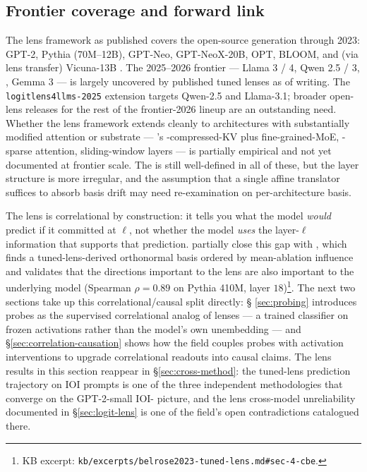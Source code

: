 \subsection{Frontier coverage and forward link}
\label{sec:lens-forward}

The lens framework as published covers the open-source generation
through 2023: GPT-2, Pythia (70M–12B), GPT-Neo, GPT-NeoX-20B, OPT,
BLOOM, and (via lens transfer) Vicuna-13B
\citep[\S 3, \S 5]{belrose2023-tuned-lens}. The 2025–2026 frontier ---
Llama 3 / 4, Qwen 2.5 / 3, , Gemma 3 --- is largely
uncovered by published tuned lenses as of writing. The
\texttt{logitlens4llms-2025} extension targets Qwen-2.5 and Llama-3.1;
broader open-lens releases for the rest of the frontier-2026 lineup
are an outstanding need. Whether the lens framework extends cleanly
to architectures with substantially modified attention or  substrate
--- 's -compressed-KV plus fine-grained-MoE, -sparse
attention, sliding-window layers --- is partially empirical and not
yet documented at frontier scale. The  is still
well-defined in all of these, but the layer structure is more
irregular, and the assumption that a single affine translator suffices
to absorb basis drift may need re-examination on per-architecture
basis.

The lens is correlational by construction: it tells you what the model
\emph{would} predict if it committed at $\ell$, not whether the model
\emph{uses} the layer-$\ell$ information that supports that prediction.
\citet[\S 4]{belrose2023-tuned-lens} partially close this gap with
\emph{}, which finds a tuned-lens-derived
orthonormal basis ordered by mean-ablation influence and validates that
the directions important to the lens are also important to the
underlying model (Spearman $\rho = 0.89$ on Pythia 410M, layer
$18$)\footnote{KB excerpt:
\nolinkurl{kb/excerpts/belrose2023-tuned-lens.md#sec-4-cbe}.}. The next
two sections take up this correlational/causal split directly: §%
\ref{sec:probing} introduces probes as the supervised correlational
analog of lenses --- a trained classifier on frozen activations rather
than the model's own unembedding --- and §\ref{sec:correlation-causation}
shows how the field couples probes with activation interventions to
upgrade correlational readouts into causal claims. The lens results in
this section reappear in §\ref{sec:cross-method}: the tuned-lens
prediction trajectory on IOI prompts is one of the three independent
methodologies that converge on the GPT-2-small IOI- picture, and
the lens cross-model unreliability documented in
\S\ref{sec:logit-lens} is one of the field's open contradictions
catalogued there.
